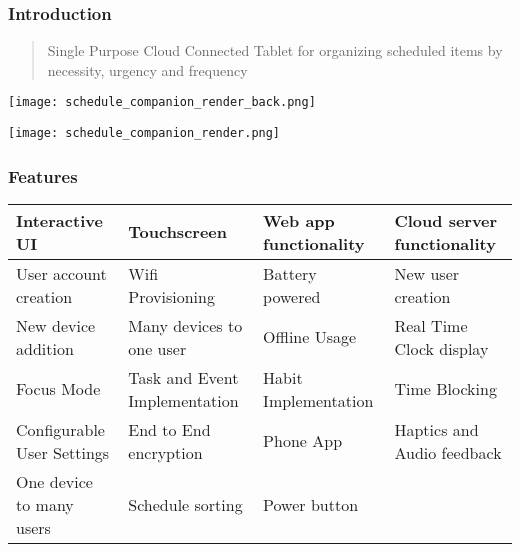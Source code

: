 \documentclass{beamer}
\begin{document}
\frame{\titlepage}

\begin{frame}
  \frametitle{Introduction}
  \begin{quote}{}
    Single Purpose Cloud Connected Tablet for organizing scheduled items by necessity, urgency and frequency
  \end{quote}

  \begin{minipage}{0.33\textwidth}
    \texttt{[image: schedule\_companion\_render\_back.png]}
  \end{minipage}
  \hfill
  \begin{minipage}{0.65\textwidth}
    \texttt{[image: schedule\_companion\_render.png]}
  \end{minipage}%

\end{frame}

\begin{frame}
  \frametitle{Features}
\centering
\small
\begin{tabular}{|p{}|p{}|p{}|p{}|}
\hline
\cellcolor[HTML]{CFE2F3}Interactive UI        & Touchscreen                                           & \cellcolor[HTML]{CFE2F3}Web app functionality & \cellcolor[HTML]{CFE2F3}Cloud server functionality \\ \hline
\cellcolor[HTML]{CFE2F3}User account creation & \cellcolor[HTML]{CFE2F3}Wifi Provisioning             & Battery powered                               & \cellcolor[HTML]{CFE2F3}New user creation          \\ \hline
\cellcolor[HTML]{CFE2F3}New device addition                           & \cellcolor[HTML]{CFE2F3}Many devices to one user      & \cellcolor[HTML]{CFE2F3}Offline Usage         & \cellcolor[HTML]{CFE2F3}Real Time Clock display    \\ \hline
\cellcolor[HTML]{CFE2F3}Focus Mode            & \cellcolor[HTML]{CFE2F3}Task and Event Implementation & \cellcolor[HTML]{CFE2F3}Habit Implementation  & Time Blocking                                      \\ \hline
Configurable User Settings                    & End to End encryption                                 & Phone App                                     & Haptics and Audio feedback                         \\ \hline
One device to many users                      & Schedule sorting                                      & Power button                                  &                                                    \\ \hline
\end{tabular}
\end{frame}
\end{document}

